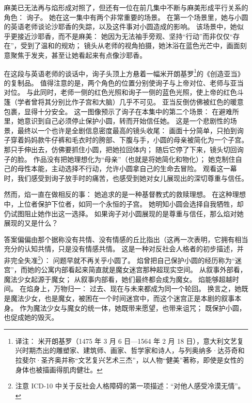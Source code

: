 麻美已无法再与焰形成对照了，但还有一位在前几集中不断与麻美形成平行关系的角色：
询子。
她在这一集中有两个非常重要的场景。
在第一个场景里，她与小圆的英语老师谈论沙耶香的失踪，以及这件事对小圆造成的影响。
该场景中，她似乎更接近沙耶香，而不是麻美：
她因为无法袖手旁观、坚持“行动”而非仅仅“存在”，受到了温和的规劝；
镜头从老师的视角拍摄，她沐浴在蓝色光芒中，画面刻意聚焦于发夹，甚至让她看起来有点像沙耶香。

在这段与英语老师的谈话中，询子头顶上方悬着一幅米开朗基罗\footnote{%
    译注：
    米开朗基罗（1475 年 3 月 6 日—1564 年 2 月 18 日），意大利文艺复兴时期杰出的雕塑家、建筑师、画家、哲学家和诗人，与列奥纳多·达芬奇和拉斐尔·圣齐奥并称“文艺复兴艺术三杰”，以人物“健美”著称，即使是女性的身体也被描画得肌肉健壮。
}的《创造亚当》的复制品。
值得注意的是，两个角色的位置分别使询子与上帝对位、老师与亚当对位。
与此同时，老师一侧的红色光照和询子一侧的蓝色光照，使上帝的红色斗篷（学者曾将其分别比作子宫\cite{ref66}和大脑\cite{ref67}）几乎不可见。
亚当反倒仿佛被红色的暖意包裹，显得十分安全。
这一图像预示了询子在本集中的第二个场景：
在避难所里，她意识到自己必须停止保护小圆，转而开始信任她。
这是一个悲剧性的场景，最终以一个也许是全剧信息密度最高的镜头收尾：
画面十分简单，只拍到询子穿着妈妈款牛仔裤和毛衣时的胯部、下腹与手，小圆的母亲被简化为一个子宫。
那只手伸出去，仿佛要抓住小圆，把她拉回体内；
随后它停了下来，镜头切回询子的脸。
作品没有把她理想化为“母亲”（也就是将她简化和物化）；
她克制住自己的母性本能，主动选择不行动，允许小圆拿自己的生命去冒险。
观看这一幕时，我们感受到询子放手时的痛苦，也感受到她对女儿展现出的深切尊重与信任。

然而，焰一直在做相反的事：
她追求的是一种基督教式的救赎理想。
在这种理想中，上位者保护下位者，如同一个永恒的子宫。
她明知小圆会选择自我牺牲，却仍试图阻止她作出这一选择。
如果询子对小圆展现的是尊重与信任，那么焰对她展现的又是什么？

答案偏偏由那个据称没有共情、没有情感的丘比指出（这再一次表明，它拥有相当充分的认知共情，只是没有情感共情。
这是一种对反社会人格者的初步描述，并非完全失准\footnote{%
    注意 ICD-10 中关于反社会人格障碍的第一项描述：“对他人感受冷漠无情”。
}\cite{ref68}）：
问题早就不再关乎小圆了。
焰曾把自己保护小圆的经历称为“迷宫”，而她的公寓内部看起来简直就是魔女迷宫那种超现实空间。
从叙事外部看，魔法少女起源于魔女；
从叙事内部看，她们最终都会成为魔女。
焰能够超越时间。
在焰身上，万物归一：
过去、现在与未来都成为同一个轮回。
换言之，她既是魔法少女，也是魔女，被困在一个时间迷宫中，而这个迷宫正是本剧的叙事本身。
作为魔法少女与魔女的统一体，她既带来愿望，也带来诅咒；
既保护小圆，也促成她的毁灭。

